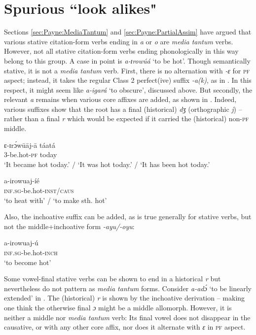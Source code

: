 \documentclass[output=paper,colorlinks,citecolor=brown
]{langscibook}
\begin{document}
\section{Spurious ``look alikes"}\label{sec:Payne:Spurious}

Sections \ref{sec:Payne:MediaTantum} and \ref{sec:Payne:PartialAssim} have argued that various stative citation-form verbs ending in \textit{a} or \textit{o} are \textit{media tantum} verbs. However, not all stative citation-form verbs ending phonologically in this way belong to this group. A case in point is \textit{a-ɪrowúá} `to be hot’. Though semantically stative, it is not a \textit{media tantum} verb. First, there is no alternation with \textit{-ɛ} for \textsc{pf} aspect; instead, it takes the regular Class 2 perfect(ive) suffix \textit{-a(k)}, as in . In this respect, it might seem like \textit{a-igará} `to obscure', discussed above. But secondly, the relevant \emph{a} remains when various core affixes are added, as shown in . Indeed, various suffixes show that the root has a final (historical) \textit{dʒ} (orthographic \textit{j}) -- rather than a final \textit{r} which would be expected if it carried the (historical) non-\textsc{pf} middle.

\ea \label{ex:Payne:hot}
\gll ɛ-ɪrɔ́wūāj-ā táatá \\
3-be.hot-\textsc{pf}	today \\
\glt `It became hot today.’ / `It was hot today.’ / `It has been hot today.’
\z 

\ea \label{ex:Payne:hot-inst}
\gll a-irowuaj-íé \\
\textsc{inf.sg}-be.hot-\textsc{inst/caus}\\
\glt `to heat with' / `to make sth. hot'
\z 

Also, the inchoative suffix can be added, as is true generally for stative verbs, but not the middle+inchoative form \textit{-ayu/-oyu}:

\ea\label{ex:Payne:become-hot}
\gll a-irowuaj-ú\\
\textsc{inf.sg}-be.hot-\textsc{inch}\\
\glt `to become hot'
\z 

Some vowel-final stative verbs can be shown to end in a historical \textit{r} but nevertheless do not pattern as \textit{media tantum} forms. Consider \textit{a-adɔ́} `to be linearly extended' in . The (historical) \textit{r} is shown by the inchoative derivation -- making one think the otherwise final \textit{ɔ} might be a middle allomorph. However, it is neither a middle nor \textit{media tantum} verb: Its final vowel does not disappear in the causative, or with any other core affix, nor does it alternate with \textit{ɛ} in \textsc{pf} aspect.
\end{document}
